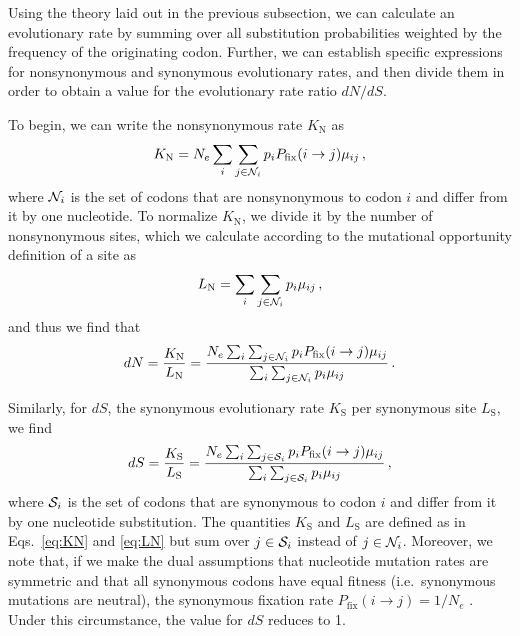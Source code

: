 \documentclass{pnastwo}
\begin{document}
\begin{article}
Using the theory laid out in the previous subsection, we can calculate an evolutionary rate by summing over all substitution probabilities weighted by the frequency of the originating codon. Further, we can establish specific expressions for nonsynonymous and synonymous evolutionary rates, and then divide them in order to obtain a value for the evolutionary rate ratio $dN/dS$.

To begin, we can write the nonsynonymous rate $K_\text{N}$ as 
\begin{equation}\label{eq:kN}
	K_\text{N} = N_e \sum_i \sum_{j \in {\cal N}_i} p_i P_\text{fix}(i \rightarrow j) \mu_{ij}\,,
\end{equation}
where ${\cal N}_i$ is the set of codons that are nonsynonymous to codon $i$ and differ from it by one nucleotide. To normalize $K_\text{N}$, we divide it by the number of nonsynonymous sites, which we calculate according to the mutational opportunity definition of a site \cite{GoldmanYang1994, Yang2006} as 
\begin{equation}\label{eq:LN}
	L_\text{N} = \sum_i \sum_{j \in {\cal N}_i} p_i \mu_{ij}\,, 
\end{equation} and thus we find that 
\begin{equation}\label{eq:dN}
	dN = \frac{K_\text{N}}{L_\text{N}}=\frac{N_e \sum_i \sum_{j \in {\cal N}_i} p_i P_\text{fix}(i \rightarrow j) \mu_{ij} } {\sum_i \sum_{j \in {\cal N}_i} p_i \mu_{ij}}\,.
\end{equation}
		
Similarly, for $dS$, the synonymous evolutionary rate $K_\text{S}$ per synonymous site $L_\text{S}$, we find
\begin{equation}\label{eq:dS}
	dS = \frac{K_\text{S}}{L_\text{S}}=\frac{ N_e \sum_i \sum_{j \in {\cal S}_i} p_i P_\text{fix}(i \rightarrow j) \mu_{ij} } {\sum_i \sum_{j \in {\cal S}_i} p_i \mu_{ij} }\,,
\end{equation}
where ${\cal S}_i$ is the set of codons that are synonymous to codon $i$ and differ from it by one nucleotide substitution. The quantities $K_\text{S}$ and $L_\text{S}$ are defined as in Eqs.~\eqref{eq:KN} and \eqref{eq:LN} but sum over $j\in {\cal S}_i$ instead of $j\in {\cal N}_i$. Moreover, we note that, if we make the dual assumptions that nucleotide mutation rates are symmetric and that all synonymous codons have equal fitness (i.e.\ synonymous mutations are neutral), the synonymous fixation rate $P_\text{fix}(i \rightarrow j)= 1/N_e$ \cite{CrowKimura1970}. Under this circumstance, the value for $dS$ reduces to 1.
		

\end{article}
\end{document}
